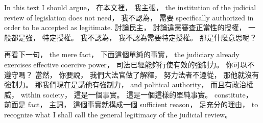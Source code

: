 \hypertarget{w02:cue:570}{}In this text
\hypertarget{w02:cue:571}{}I should argue，
\hypertarget{w02:cue:572}{}在本文裡，
\hypertarget{w02:cue:573}{}我主張，
\hypertarget{w02:cue:574}{}the institution of the judicial review of legislation does not need，
\hypertarget{w02:cue:575}{}我不認為，
\hypertarget{w02:cue:576}{}需要 specifically authorized in order to be accepted as legitimate.
\hypertarget{w02:cue:577}{}討論民主，
\hypertarget{w02:cue:578}{}討論違憲審查正當性的授權，
\hypertarget{w02:cue:579}{}一般都是強，
\hypertarget{w02:cue:580}{}特定授權。
\hypertarget{w02:cue:581}{}我不認為，
\hypertarget{w02:cue:582}{}我不認為需要特定授權。
\hypertarget{w02:cue:583}{}那是什麼意思呢？

\hypertarget{w02:cue:584}{}再看下一句，
\hypertarget{w02:cue:585}{}the mere fact，
\hypertarget{w02:cue:586}{}下面這個單純的事實，
\hypertarget{w02:cue:587}{}the judiciary already exercises effective coercive power，
\hypertarget{w02:cue:588}{}司法已經能夠行使有效的強制力。
\hypertarget{w02:cue:589}{}你可以不遵守嗎？
\hypertarget{w02:cue:590}{}當然，
\hypertarget{w02:cue:591}{}你要說，
\hypertarget{w02:cue:592}{}我們大法官做了解釋，
\hypertarget{w02:cue:593}{}努力法者不遵從，
\hypertarget{w02:cue:594}{}那他就沒有強制力。
\hypertarget{w02:cue:595}{}那我們現在是講他有強制力，
\hypertarget{w02:cue:596}{}and political authority，
\hypertarget{w02:cue:597}{}而且有政治權威，
\hypertarget{w02:cue:598}{}within society，
\hypertarget{w02:cue:599}{}這是一個事實。
\hypertarget{w02:cue:600}{}這是一個這樣的單純事實。
\hypertarget{w02:cue:601}{}constitute，
\hypertarget{w02:cue:602}{}前面是 fact，
\hypertarget{w02:cue:603}{}主詞，
\hypertarget{w02:cue:604}{}這個事實就構成一個 sufficient reason，
\hypertarget{w02:cue:605}{}足充分的理由，
\hypertarget{w02:cue:606}{}to recognize what I shall call the general legitimacy of the judicial review。


